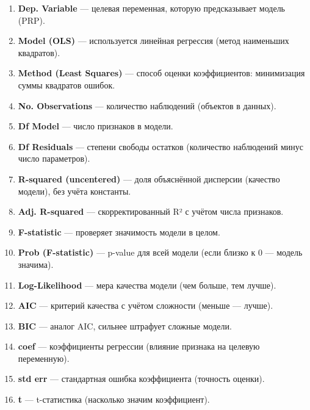 \begin{enumerate}
    \item \textbf{Dep. Variable} — целевая переменная, которую предсказывает модель (PRP).

    \item \textbf{Model (OLS)} — используется линейная регрессия (метод наименьших квадратов).

    \item \textbf{Method (Least Squares)} — способ оценки коэффициентов: минимизация суммы квадратов ошибок.

    \item \textbf{No. Observations} — количество наблюдений (объектов в данных).

    \item \textbf{Df Model} — число признаков в модели.

    \item \textbf{Df Residuals} — степени свободы остатков (количество наблюдений минус число параметров).

    \item \textbf{R-squared (uncentered)} — доля объяснённой дисперсии (качество модели), без учёта константы.

    \item \textbf{Adj. R-squared} — скорректированный R² с учётом числа признаков.

    \item \textbf{F-statistic} — проверяет значимость модели в целом.

    \item \textbf{Prob (F-statistic)} — p-value для всей модели (если близко к 0 — модель значима).

    \item \textbf{Log-Likelihood} — мера качества модели (чем больше, тем лучше).

    \item \textbf{AIC} — критерий качества с учётом сложности (меньше — лучше).

    \item \textbf{BIC} — аналог AIC, сильнее штрафует сложные модели.

    \item \textbf{coef} — коэффициенты регрессии (влияние признака на целевую переменную).

    \item \textbf{std err} — стандартная ошибка коэффициента (точность оценки).

    \item \textbf{t} — t-статистика (насколько значим коэффициент).


\end{enumerate}
